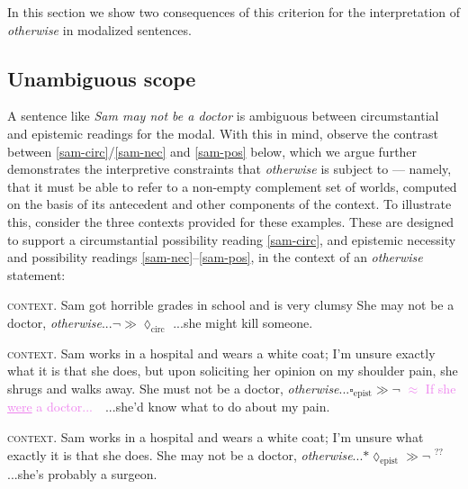 In this section we show two consequences of this criterion for the interpretation of \textit{otherwise} in modalized sentences. 


\subsection{Unambiguous scope} \label{sec:scope}

A sentence like \textit{Sam may not be a doctor} is ambiguous between circumstantial and epistemic readings for the modal. With this in mind, observe the contrast between \ref{sam-circ}/\ref{sam-nec} and \ref{sam-pos} below, which we argue further demonstrates the interpretive constraints that \textit{otherwise} is subject to --- namely, that it must be able to refer to a non-empty complement set of worlds, computed on the basis of its antecedent and other components of the context. To illustrate this, consider the three contexts provided for these examples. These are designed to support a circumstantial possibility reading \ref{sam-circ}, and epistemic necessity and possibility readings \ref{sam-nec}--\ref{sam-pos}, in the context of an \textit{otherwise} statement:

\pex  \textsc{context.} Sam got horrible grades in school and is very clumsy\label{sam-circ}
\a   She may not be a doctor, \textit{otherwise}...\hfill$ \neg\gg\lozenge_\text{circ} $
\a  \makebox[0.45\textwidth][l]{\textcolor{violet}{$ \approx $ If she were (to become) a doctor...}} ...she might kill someone.\xe


\pex  \textsc{context.} Sam works in a hospital and wears a white coat; I'm unsure exactly what it is that she does, but upon soliciting her opinion on my shoulder pain, she shrugs and walks away.\label{sam-nec}
\a   She must not be a doctor, \textit{otherwise}...\hfill $ \square_\text{epist}\gg\neg $
\a  \textcolor{violet}{$ \approx $ If she \uline{were} a doctor...} \,\,\,\,...she'd know what to do about my pain.\xe

\pex  \textsc{context.} Sam works in a hospital and wears a white coat; I'm unsure what exactly it is that she does.\label{sam-pos}
\a   She may not be a doctor, \textit{otherwise}...\hfill $ 	*\lozenge_\text{epist}\gg\neg $
 \hspace{2em}$ ^{??}$...she's probably a surgeon.
\xe

